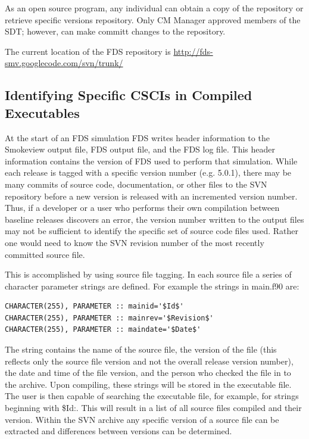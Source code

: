 \documentclass[11pt]{book}
\begin{document}
As an open source program, any individual can obtain a copy of the repository or retrieve specific versions
repository.  Only CM Manager approved members of the SDT; however, can make committ changes to the repository.

The current location of the FDS repository is \href{http://fds-smv.googlecode.com/svn/trunk/}
{{\ct http://fds-smv.googlecode.com/svn/trunk/}}

\subsection{Identifying Specific CSCIs in Compiled Executables}

At the start of an FDS simulation FDS writes header information to the Smokeview output file, FDS output file,
and the FDS log file.  This header information contains the version of FDS used to perform that simulation.
While each release is tagged with a specific version number (e.g. 5.0.1), there may be many commits of source
code, documentation, or other files to the SVN repository before a new version is released with an incremented
version number.  Thus, if a developer or a user who performs their own compilation between baseline releases
discovers an error, the version number written to the output files may not be sufficient to identify the
specific set of source code files used.  Rather one would need to know the SVN revision number of the most
recently committed source file.

This is accomplished by using source file tagging.  In each source file a series of character parameter
strings are defined.  For example the strings in main.f90 are:

\footnotesize
\begin{verbatim}
CHARACTER(255), PARAMETER :: mainid='$Id$'
CHARACTER(255), PARAMETER :: mainrev='$Revision$'
CHARACTER(255), PARAMETER :: maindate='$Date$'
\end{verbatim}
\normalsize

The string contains the name of the source file, the version of the file (this reflects only the source
file version and not the overall release version number), the date and time of the file version, and
the person who checked the file in to the archive.  Upon compiling, these strings will be stored in the
executable file.  The user is then capable of searching the executable file, for example, for strings
beginning with {\ct \$Id:}.  This will result in a list of all source files compiled and their version.
Within the SVN archive any specific version of a source file can be extracted and differences between
versions can be determined.
\end{document}
